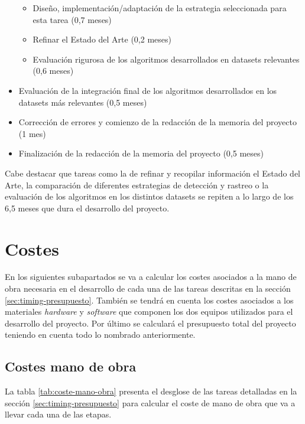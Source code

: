 \begin{itemize}
    \begin{itemize}
        \item Diseño, implementación/adaptación de la estrategia seleccionada para esta tarea (0,7 meses)
        \item Refinar el Estado del Arte (0,2 meses)
        \item Evaluación rigurosa de los algoritmos desarrollados en datasets relevantes (0,6 meses)
    \end{itemize}
    
    \item Evaluación de la integración final de los algoritmos desarrollados en los datasets más relevantes (0,5 meses)
    
    \item Corrección de errores y comienzo de la redacción de la memoria del proyecto (1 mes)
    
    \item Finalización de la redacción de la memoria del proyecto (0,5 meses)
\end{itemize}

Cabe destacar que tareas como la de refinar y recopilar información el Estado del Arte, la comparación de diferentes estrategias de detección y rastreo o la evaluación de los algoritmos en los distintos datasets se repiten a lo largo de los 6,5 meses que dura el desarrollo del proyecto.

\section{Costes}
\label{sec:costes-presupuesto}

En los siguientes subapartados se va a calcular los costes asociados a la mano de obra necesaria en el desarrollo de cada una de las tareas descritas en la sección \ref{sec:timing-presupuesto}. También se tendrá en cuenta los costes asociados a los materiales \textit{hardware} y \textit{software} que componen los dos equipos utilizados para el desarrollo del proyecto. Por último se calculará el presupuesto total del proyecto teniendo en cuenta todo lo nombrado anteriormente.

\subsection{Costes mano de obra}
\label{subsec:costes-mano-obra}

La tabla \ref{tab:coste-mano-obra} presenta el desglose de las tareas detalladas en la sección \ref{sec:timing-presupuesto} para calcular el coste de mano de obra que va a llevar cada una de las etapas.


